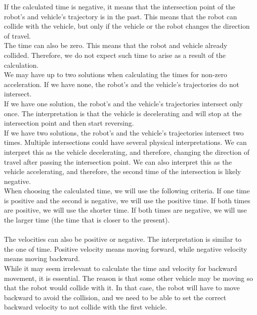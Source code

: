         If the calculated time is negative, it means that the intersection point of the robot's and vehicle's trajectory is in the past. This means that the robot can collide with the vehicle, but only if the vehicle or the robot changes the direction of travel.\\
        The time can also be zero. This means that the robot and vehicle already collided. Therefore, we do not expect such time to arise as a result of the calculation.\\
        We may have up to two solutions when calculating the times for non-zero acceleration. If we have none, the robot's and the vehicle's trajectories do not intersect.\\
        If we have one solution, the robot's and the vehicle's trajectories intersect only once. The interpretation is that the vehicle is decelerating and will stop at the intersection point and then start reversing.\\
        If we have two solutions, the robot's and the vehicle's trajectories intersect two times. Multiple intersections could have several physical interpretations. We can interpret this as the vehicle decelerating, and therefore, changing the direction of travel after passing the intersection point. We can also interpret this as the vehicle accelerating, and therefore, the second time of the intersection is likely negative.\\
        When choosing the calculated time, we will use the following criteria. If one time is positive and the second is negative, we will use the positive time. If both times are positive, we will use the shorter time. If both times are negative, we will use the larger time (the time that is closer to the present).\\\\
        The velocities can also be positive or negative. The interpretation is similar to the one of time. Positive velocity means moving forward, while negative velocity means moving backward.\\
        While it may seem irrelevant to calculate the time and velocity for backward movement, it is essential. The reason is that some other vehicle may be moving so that the robot would collide with it. In that case, the robot will have to move backward to avoid the collision, and we need to be able to set the correct backward velocity to not collide with the first vehicle.\\\\
